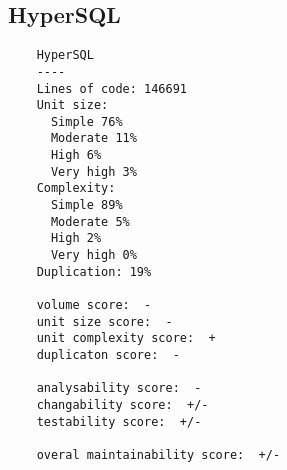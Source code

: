 \documentclass[journal]{IEEEtran}
\begin{document}
\subsection{HyperSQL}
\begin{verbatim}
    HyperSQL
    ----
    Lines of code: 146691
    Unit size: 
      Simple 76%
      Moderate 11%
      High 6%
      Very high 3%
    Complexity: 
      Simple 89%
      Moderate 5%
      High 2%
      Very high 0%
    Duplication: 19%

    volume score:  -
    unit size score:  -
    unit complexity score:  +
    duplicaton score:  -

    analysability score:  -
    changability score:  +/-
    testability score:  +/-

    overal maintainability score:  +/-
\end{verbatim}




%
%
%


\printbibliography


\end{document}
